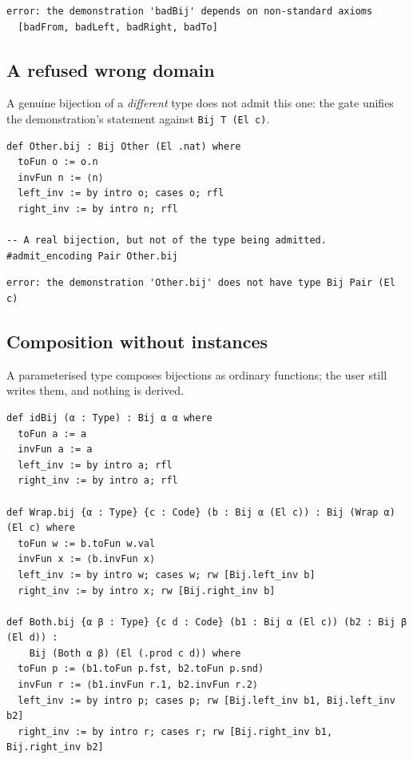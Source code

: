 \documentclass[10pt,a4paper]{article}
\newcommand{\file}[1]{\texttt{\small #1}}
\begin{document}
\begin{lstlisting}[style=out]
error: the demonstration 'badBij' depends on non-standard axioms
  [badFrom, badLeft, badRight, badTo]
\end{lstlisting}

\subsection*{A refused wrong domain}

A genuine bijection of a \emph{different} type does not admit this one: the gate
unifies the demonstration's statement against \texttt{Bij T (El c)}.

\begin{lstlisting}[caption={\file{bench/AdmissionWrongDomain.lean}.}]
def Other.bij : Bij Other (El .nat) where
  toFun o := o.n
  invFun n := ⟨n⟩
  left_inv := by intro o; cases o; rfl
  right_inv := by intro n; rfl

-- A real bijection, but not of the type being admitted.
#admit_encoding Pair Other.bij
\end{lstlisting}

\begin{lstlisting}[style=out]
error: the demonstration 'Other.bij' does not have type Bij Pair (El c)
\end{lstlisting}

\subsection*{Composition without instances}

A parameterised type composes bijections as ordinary functions; the user still
writes them, and nothing is derived.

\begin{lstlisting}[caption={\file{bench/AdmissionParam.lean}.}]
def idBij (α : Type) : Bij α α where
  toFun a := a
  invFun a := a
  left_inv := by intro a; rfl
  right_inv := by intro a; rfl

def Wrap.bij {α : Type} {c : Code} (b : Bij α (El c)) : Bij (Wrap α) (El c) where
  toFun w := b.toFun w.val
  invFun x := ⟨b.invFun x⟩
  left_inv := by intro w; cases w; rw [Bij.left_inv b]
  right_inv := by intro x; rw [Bij.right_inv b]

def Both.bij {α β : Type} {c d : Code} (b1 : Bij α (El c)) (b2 : Bij β (El d)) :
    Bij (Both α β) (El (.prod c d)) where
  toFun p := (b1.toFun p.fst, b2.toFun p.snd)
  invFun r := ⟨b1.invFun r.1, b2.invFun r.2⟩
  left_inv := by intro p; cases p; rw [Bij.left_inv b1, Bij.left_inv b2]
  right_inv := by intro r; cases r; rw [Bij.right_inv b1, Bij.right_inv b2]
\end{lstlisting}
\end{document}
